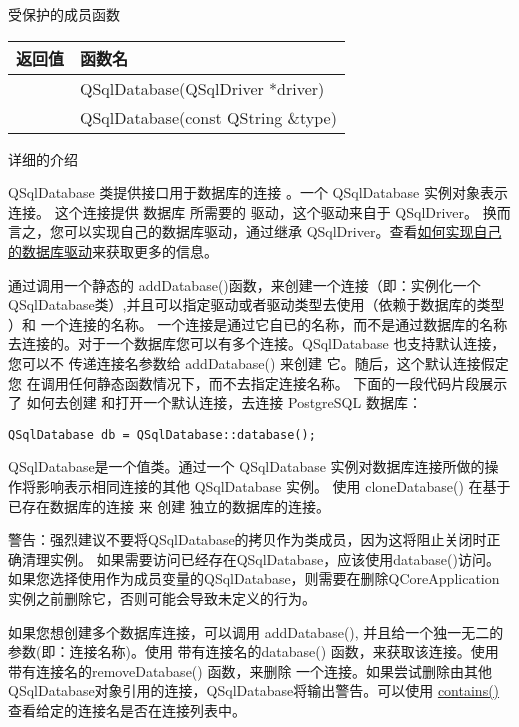 受保护的成员函数

\begin{tabular}{|r|l|}
	\hline
	返回值 & 函数名 \\
	\hline
	&QSqlDatabase(QSqlDriver *driver)\\
	\hline
	&QSqlDatabase(const QString \&type)\\
	\hline
\end{tabular}

详细的介绍

QSqlDatabase 类提供接口用于数据库的连接 。一个 QSqlDatabase 实例对象表示连接。 这个连接提供 数据库 所需要的 驱动，这个驱动来自于 QSqlDriver。 换而言之，您可以实现自己的数据库驱动，通过继承 QSqlDriver。查看\href{https://doc.qt.io/qt-5/sql-driver.html#how-to-write-your-own-database-driver}{如何实现自己的数据库驱动}来获取更多的信息。

通过调用一个静态的 addDatabase()函数，来创建一个连接（即：实例化一个QSqlDatabase类）,并且可以指定驱动或者驱动类型去使用（依赖于数据库的类型 ）和 一个连接的名称。 一个连接是通过它自已的名称，而不是通过数据库的名称去连接的。对于一个数据库您可以有多个连接。QSqlDatabase 也支持默认连接，您可以不 传递连接名参数给 addDatabase() 来创建 它。随后，这个默认连接假定您 在调用任何静态函数情况下，而不去指定连接名称。 下面的一段代码片段展示了 如何去创建 和打开一个默认连接，去连接 PostgreSQL 数据库：

\begin{lstlisting}
QSqlDatabase db = QSqlDatabase::database();
\end{lstlisting}

QSqlDatabase是一个值类。通过一个 QSqlDatabase 实例对数据库连接所做的操作将影响表示相同连接的其他 QSqlDatabase 实例。 使用 cloneDatabase() 在基于已存在数据库的连接 来 创建 独立的数据库的连接。

警告：强烈建议不要将QSqlDatabase的拷贝作为类成员，因为这将阻止关闭时正确清理实例。 如果需要访问已经存在QSqlDatabase，应该使用database()访问。如果您选择使用作为成员变量的QSqlDatabase，则需要在删除QCoreApplication实例之前删除它，否则可能会导致未定义的行为。

如果您想创建多个数据库连接，可以调用 addDatabase(), 并且给一个独一无二的参数(即：连接名称)。使用 带有连接名的database() 函数，来获取该连接。使用 带有连接名的removeDatabase() 函数，来删除 一个连接。如果尝试删除由其他QSqlDatabase对象引用的连接，QSqlDatabase将输出警告。可以使用 \href{https://github.com/QtDocumentCN/QtDocumentCN/blob/master/Src/S/QSqlDatabase/QSqlDatabase.md#static-bool-qsqldatabasecontainsconst-qstring-connectionname--qlatin1stringdefaultconnection}{contains()}查看给定的连接名是否在连接列表中。


